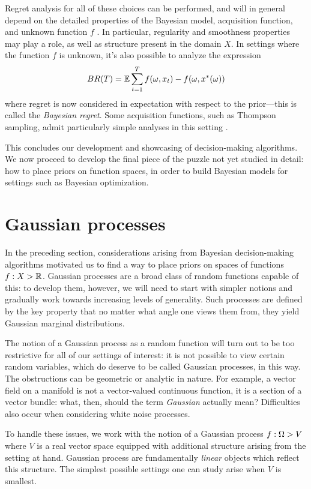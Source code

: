 \documentclass[11pt]{book}
\begin{document}
Regret analysis for all of these choices can be performed, and will in general depend on the detailed properties of the Bayesian model, acquisition function, and unknown function $f$ \cite{srinivas09}.
In particular, regularity and smoothness properties may play a role, as well as structure present in the domain $X$.
In settings where the function $f$ is unknown, it's also possible to analyze the expression 
\[
BR(T) = \operatorname{\mathbb{E}} \sum_{t=1}^T f(\omega,x_t) - f(\omega,x^*(\omega))    
\]
where regret is now considered in expectation with respect to the prior---this is called the \emph{Bayesian regret}.
Some acquisition functions, such as Thompson sampling, admit particularly simple analyses in this setting \cite{lattimore20}.

This concludes our development and showcasing of decision-making algorithms.
We now proceed to develop the final piece of the puzzle not yet studied in detail: how to place priors on function spaces, in order to build Bayesian models for settings such as Bayesian optimization.

\section{Gaussian processes}

In the preceding section, considerations arising from Bayesian decision-making algorithms motivated us to find a way to place priors on spaces of functions $f : X \-> \mathbb{R}$.
Gaussian processes are a broad class of random functions capable of this: to develop them, however, we will need to start with simpler notions and gradually work towards increasing levels of generality.
Such processes are defined by the key property that no matter what angle one views them from, they yield Gaussian marginal distributions.

The notion of a Gaussian process as a random function will turn out to be too restrictive for all of our settings of interest: it is not possible to view certain random variables, which do deserve to be called Gaussian processes, in this way.
The obstructions can be geometric or analytic in nature.
For example, a vector field on a manifold is not a vector-valued continuous function, it is a section of a vector bundle: what, then, should the term \emph{Gaussian} actually mean?
Difficulties also occur when considering white noise processes.

To handle these issues, we work with the notion of a Gaussian process $f : \Omega \-> V$ where $V$ is a real vector space equipped with additional structure arising from the setting at hand.
Gaussian process are fundamentally \emph{linear} objects which reflect this structure.
The simplest possible settings one can study arise when $V$ is smallest.
\end{document}
